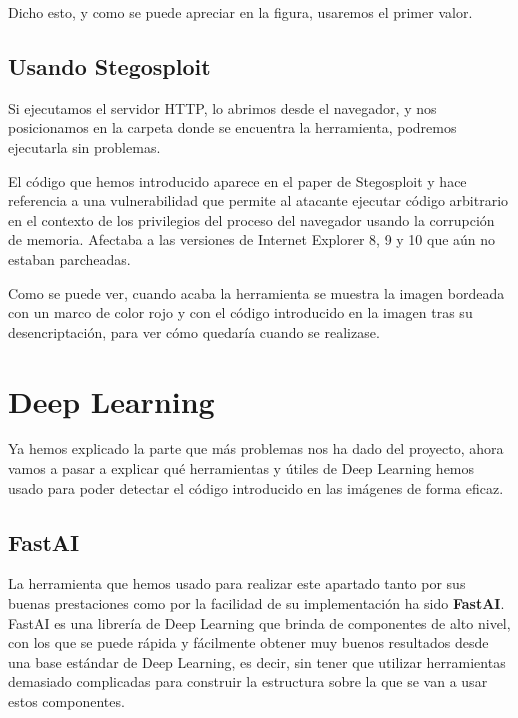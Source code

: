 Dicho esto, y como se puede apreciar en la figura, usaremos el primer valor.

\subsection{Usando Stegosploit}

Si ejecutamos el servidor HTTP, lo abrimos desde el navegador, y nos posicionamos en la carpeta donde se encuentra la herramienta, podremos ejecutarla sin problemas.



El código que hemos introducido aparece en el paper de Stegosploit y hace referencia a una vulnerabilidad que permite al atacante ejecutar código arbitrario en el contexto de los privilegios del proceso del navegador usando la corrupción de memoria. Afectaba a las versiones de Internet Explorer 8, 9 y 10 que aún no estaban parcheadas. %


Como se puede ver, cuando acaba la herramienta se muestra la imagen bordeada con un marco de color rojo y con el código introducido en la imagen tras su desencriptación, para ver cómo quedaría cuando se realizase.

\section{Deep Learning}
\label{sec:fastai}

Ya hemos explicado la parte que más problemas nos ha dado del proyecto, ahora vamos a pasar a explicar qué herramientas y útiles de Deep Learning hemos usado para poder detectar el código introducido en las imágenes de forma eficaz.

\subsection{FastAI}

La herramienta que hemos usado para realizar este apartado tanto por sus buenas prestaciones como por la facilidad de su implementación ha sido \textbf{FastAI}. FastAI es una librería de Deep Learning que brinda de componentes de alto nivel, con los que se puede rápida y fácilmente obtener muy buenos resultados desde una base estándar de Deep Learning, es decir, sin tener que utilizar herramientas demasiado complicadas para construir la estructura sobre la que se van a usar estos componentes. %

